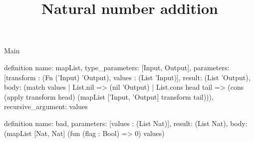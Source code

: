 \begin{lexlean}{Main}
\title{Natural number addition}
\begin{semanticmodule}
definition{
  name: mapList,
  type_parameters: [Input, Output],
  parameters: [transform : (Fn ('Input) 'Output), values : (List 'Input)],
  result: (List 'Output),
  body: (match values
    | List.nil => (nil 'Output)
    | List.cons head tail => (cons (apply transform head) (mapList ['Input, 'Output] transform tail))),
  recursive_argument: values
}

definition{
  name: bad,
  parameters: [values : (List Nat)],
  result: (List Nat),
  body: (mapList [Nat, Nat] (fun (flag : Bool) => 0) values)
}
\end{semanticmodule}
\end{lexlean}
